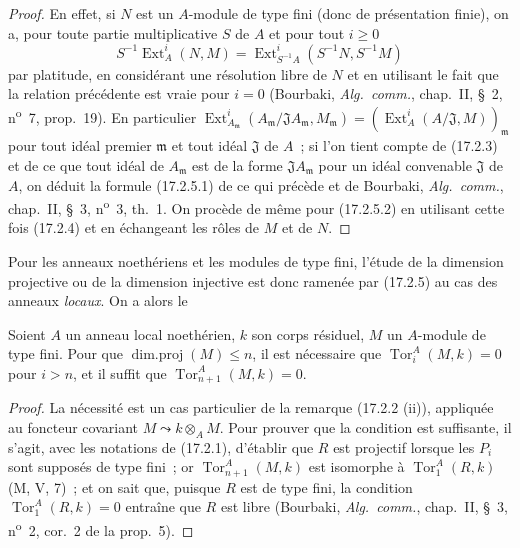 \begin{proof}
En effet, si $N$ est un $A$-module de type fini (donc de présentation finie),
on a, pour toute partie multiplicative $S$ de $A$ et pour tout $i\geq0$
\[
  S^{-1}\operatorname{Ext}^i_A(N,M)
  =\operatorname{Ext}^i_{S^{-1}A}(S^{-1}N,S^{-1}M)
\]
par platitude, en considérant une résolution libre de $N$ et en utilisant le
fait que la relation précédente est vraie pour $i=0$ (Bourbaki,
\emph{Alg.~comm.}, chap.~II, \S~2, n\textsuperscript{o}~7, prop.~19). En particulier
$\operatorname{Ext}^i_{A_{\mathfrak{m}}}
(A_{\mathfrak{m}}/\mathfrak{J}A_{\mathfrak{m}},M_{\mathfrak{m}})
=(\operatorname{Ext}^i_A(A/\mathfrak{J},M))_{\mathfrak{m}}$ pour tout idéal
premier $\mathfrak{m}$ et tout idéal $\mathfrak{J}$ de $A$~; si l'on tient
compte de (17.2.3) et de ce que tout
idéal de $A_{\mathfrak{m}}$ est de la forme $\mathfrak{J}A_{\mathfrak{m}}$
pour un idéal convenable $\mathfrak{J}$ de $A$, on déduit la formule
(17.2.5.1) de ce qui précède et de Bourbaki, \emph{Alg.~comm.}, chap.~II,
\S~3, n\textsuperscript{o}~3, th.~1. On procède de même pour (17.2.5.2) en utilisant cette fois
(17.2.4) et en échangeant les rôles de $M$ et de $N$.
\end{proof}

Pour les anneaux noethériens et les modules de type fini, l'étude de la
dimension projective ou de la dimension injective est donc ramenée par
(17.2.5) au cas des anneaux \emph{locaux}. On a alors le

\begin{lemma}[17.2.6]
\label{0.17.2.6-fr}
Soient $A$ un anneau local noethérien, $k$ son corps résiduel, $M$ un
$A$-module de type fini. Pour que $\operatorname{dim.proj}(M)\leq n$, il est
nécessaire que $\operatorname{Tor}^A_i(M,k)=0$ pour $i>n$, et il suffit que
$\operatorname{Tor}^A_{n+1}(M,k)=0$.
\end{lemma}

\begin{proof}
La nécessité est un cas particulier de la remarque (17.2.2 (ii)), appliquée au
foncteur covariant $M\leadsto k\otimes_A M$. Pour prouver que la condition est
suffisante, il s'agit, avec les notations de (17.2.1), d'établir que $R$ est
projectif lorsque les $P_i$ sont supposés de type fini~; or
$\operatorname{Tor}^A_{n+1}(M,k)$ est isomorphe à
$\operatorname{Tor}^A_1(R,k)$ (M, V, 7)~; et on sait que, puisque $R$ est de
type fini, la condition $\operatorname{Tor}^A_1(R,k)=0$ entraîne que $R$ est
libre (Bourbaki, \emph{Alg.~comm.}, chap.~II, \S~3, n\textsuperscript{o}~2, cor.~2 de la
prop.~5).
\end{proof}

